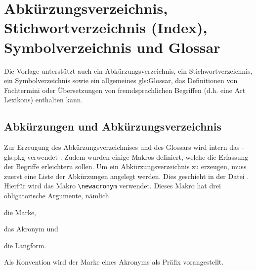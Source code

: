 \section{Abkürzungsverzeichnis, Stichwortverzeichnis (Index), Symbolverzeichnis und Glossar}%
%
%
%
%
\label{sec:Glossare}
%
Die Vorlage unterstützt auch ein Abkürzungsverzeichnis, ein Stichwortverzeichnis,
ein Symbolverzeichnis sowie ein allgemeines \gls{gls:Glossar},
das Definitionen von Fachtermini oder
Übersetzungen von fremdsprachlichen Begriffen
(d.h. eine Art Lexikons) enthalten kann.


\subsection*{Abkürzungen und Abkürzungsverzeichnis}%
%
%
\label{sec:Akronyme}
Zur Erzeugung des Abkürzungsverzeichnises und des Glossars wird intern das
-\gls{gls:pkg} verwendet \cite{talbot2014}.
Zudem wurden einige Makros definiert, welche die Erfassung der Begriffe erleichtern sollen.
%
Um ein Abkürzungsverzeichnis zu erzeugen, muss zuerst eine Liste der Abkürzungen angelegt werden.
Dies geschieht in der Datei .
Hierfür wird das Makro \lstinline|\newacronym| verwendet.
Dieses Makro hat drei obligatorische Argumente, nämlich
\begin{itemize*}
\item die Marke,
\item das Akronym und
\item die Langform.
\end{itemize*}

Als Konvention wird der Marke eines Akronyms  als Präfix vorangestellt.

\begin{latex}[caption={Definition einer Abkürzung},label={lst:SimpleAcronymEntry}]
\end{latex}

